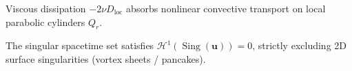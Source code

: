 \begin{theorem}
\label{thm:local_energy}
\leanok
{}
Viscous dissipation $-2\nu D_{\text{loc}}$ absorbs nonlinear convective transport on local parabolic cylinders $Q_r$.
\end{theorem}

\begin{theorem}
\label{thm:ckn_zero_measure}
\leanok
{}
The singular spacetime set satisfies $\mathcal{H}^1(\operatorname{Sing}(\boldsymbol{u})) = 0$, strictly excluding 2D surface singularities (vortex sheets / pancakes).
\end{theorem}
